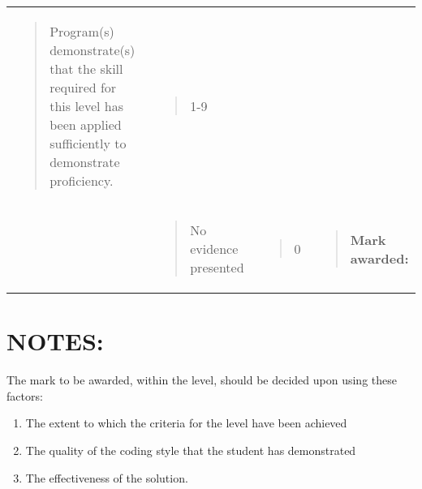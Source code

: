 \documentclass[
]{article}
\begin{document}
\begin{longtable}[]{@{}llll@{}}
\begin{minipage}[t]{0.22\columnwidth}
\begin{quote}
Program(s) demonstrate(s) that the skill required for this level has
been applied sufficiently to demonstrate proficiency.
\end{quote}\strut
\end{minipage} & \begin{minipage}[t]{0.22\columnwidth}\raggedright
\begin{quote}
1-9
\end{quote}\strut
\end{minipage} & \begin{minipage}[t]{0.22\columnwidth}\raggedright
\strut
\end{minipage}\tabularnewline
\begin{minipage}[t]{0.22\columnwidth}\raggedright
\strut
\end{minipage} & \begin{minipage}[t]{0.22\columnwidth}\raggedright
\begin{quote}
No evidence presented
\end{quote}\strut
\end{minipage} & \begin{minipage}[t]{0.22\columnwidth}\raggedright
\begin{quote}
0
\end{quote}\strut
\end{minipage} & \begin{minipage}[t]{0.22\columnwidth}\raggedright
\begin{quote}
\textbf{Mark awarded:}
\end{quote}\strut
\end{minipage}\tabularnewline
\bottomrule
\end{longtable}

\hypertarget{notes-1}{%
\section{NOTES:}\label{notes-1}}

The mark to be awarded, within the level, should be decided upon using
these factors:

\begin{enumerate}
\def\labelenumi{(\arabic{enumi})}
\item
  The extent to which the criteria for the level have been achieved
\item
  The quality of the coding style that the student has demonstrated
\item
  The effectiveness of the solution.
\end{enumerate}
\end{document}
